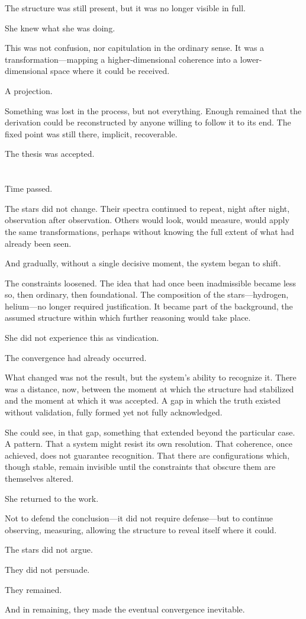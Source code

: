 The structure was still present, but it was no longer visible in
full.

She knew what she was doing.

This was not confusion, nor capitulation in the ordinary sense. It
was a transformation---mapping a higher-dimensional coherence into
a lower-dimensional space where it could be received.

A projection.

Something was lost in the process, but not everything. Enough
remained that the derivation could be reconstructed by anyone
willing to follow it to its end. The fixed point was still there,
implicit, recoverable.

The thesis was accepted.

\section{}

Time passed.

The stars did not change. Their spectra continued to repeat, night
after night, observation after observation. Others would look,
would measure, would apply the same transformations, perhaps
without knowing the full extent of what had already been seen.

And gradually, without a single decisive moment, the system began
to shift.

The constraints loosened. The idea that had once been inadmissible
became less so, then ordinary, then foundational. The composition
of the stars---hydrogen, helium---no longer required justification.
It became part of the background, the assumed structure within
which further reasoning would take place.

She did not experience this as vindication.

The convergence had already occurred.

What changed was not the result, but the system's ability to
recognize it. There was a distance, now, between the moment at
which the structure had stabilized and the moment at which it was
accepted. A gap in which the truth existed without validation,
fully formed yet not fully acknowledged.

She could see, in that gap, something that extended beyond the
particular case. A pattern. That a system might resist its own
resolution. That coherence, once achieved, does not guarantee
recognition. That there are configurations which, though stable,
remain invisible until the constraints that obscure them are
themselves altered.

She returned to the work.

Not to defend the conclusion---it did not require defense---but to
continue observing, measuring, allowing the structure to reveal
itself where it could.

The stars did not argue.

They did not persuade.

They remained.

And in remaining, they made the eventual convergence inevitable.
